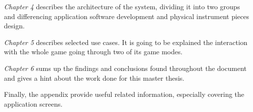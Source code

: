 \textit{Chapter 4} describes the architecture of the system, dividing it into two groups and differencing application software development and physical instrument pieces design.

\textit{Chapter 5} describes selected use cases. It is going to be explained the interaction with the whole game going through two of its game modes.

\textit{Chapter 6} sums up the findings and conclusions found throughout the document and gives a hint about the work done for this master thesis.

Finally, the appendix provide useful related information, especially covering the application screens.

